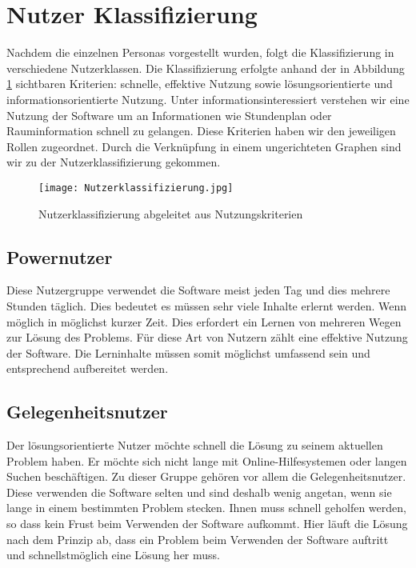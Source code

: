 \section{Nutzer Klassifizierung}
Nachdem die einzelnen Personas vorgestellt wurden, folgt die Klassifizierung in verschiedene Nutzerklassen. Die Klassifizierung erfolgte anhand der in Abbildung \ref{img1:userRoles} sichtbaren Kriterien: schnelle, effektive Nutzung sowie lösungsorientierte und informationsorientierte Nutzung. Unter informationsinteressiert verstehen wir eine Nutzung der Software um an Informationen wie Stundenplan oder Rauminformation schnell zu gelangen. Diese Kriterien haben wir den jeweiligen Rollen zugeordnet. Durch die Verknüpfung in einem ungerichteten Graphen sind wir zu der Nutzerklassifizierung gekommen.
\begin{figure}[ht]
\begin{center}
\texttt{[image: Nutzerklassifizierung.jpg]}
\caption{Nutzerklassifizierung abgeleitet aus Nutzungskriterien}
\label{img1:userRoles}
\end{center}
\end{figure} 
\subsection{Powernutzer}
Diese Nutzergruppe verwendet die Software meist jeden Tag und dies mehrere Stunden täglich. Dies bedeutet es müssen sehr viele Inhalte erlernt werden. Wenn möglich in möglichst kurzer Zeit. Dies erfordert ein Lernen von mehreren Wegen zur Lösung des Problems. Für diese Art von Nutzern zählt eine effektive Nutzung der Software. Die Lerninhalte müssen somit möglichst umfassend sein und entsprechend aufbereitet werden. 

\subsection{Gelegenheitsnutzer}
Der lösungsorientierte Nutzer möchte schnell die Lösung zu seinem aktuellen Problem haben. Er möchte sich nicht lange mit Online-Hilfesystemen oder langen Suchen beschäftigen. Zu dieser Gruppe gehören vor allem die Gelegenheitsnutzer. Diese verwenden die Software selten und sind deshalb wenig angetan, wenn sie lange in einem bestimmten Problem stecken. Ihnen muss schnell geholfen werden, so dass kein Frust beim Verwenden der Software aufkommt. Hier läuft die Lösung nach dem Prinzip ab, dass ein Problem beim Verwenden der Software auftritt und schnellstmöglich eine Lösung her muss. 

